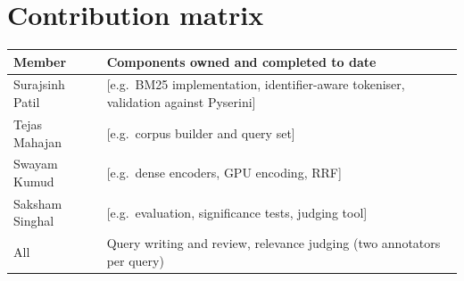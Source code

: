 \documentclass[10pt,a4paper]{article}
\newcommand{\pending}[1]{\textcolor{red!70!black}{[#1]}}
\begin{document}
\section{Contribution matrix}
\begin{table}[H]
\centering\small
\begin{tabularx}{\linewidth}{@{}l X@{}}
\toprule
Member & Components owned and completed to date\\
\midrule
Surajsinh Patil & \pending{e.g.\ BM25 implementation, identifier-aware tokeniser, validation against Pyserini}\\
Tejas Mahajan & \pending{e.g.\ corpus builder and query set}\\
Swayam Kumud & \pending{e.g.\ dense encoders, GPU encoding, RRF}\\
Saksham Singhal & \pending{e.g.\ evaluation, significance tests, judging tool}\\
All & Query writing and review, relevance judging (two annotators per query)\\
\bottomrule
\end{tabularx}
\end{table}
\end{document}
